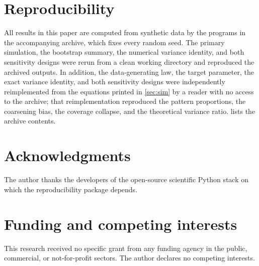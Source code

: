 \documentclass[11pt]{article}
\newif\ifinternal
\theoremstyle{definition}
\newcommand{\1}{\mathbf{1}}
\begin{document}
\section*{Reproducibility}

All results in this paper are computed from synthetic data by the programs in
the accompanying archive, which fixes every random seed. The primary simulation,
the bootstrap summary, the numerical variance identity, and both sensitivity
designs were rerun from a clean working directory and reproduced the archived
outputs. In addition, the data-generating law, the target parameter, the exact
variance identity, and both sensitivity designs were independently
reimplemented from the equations printed in \cref{sec:sim} by a reader with no
access to the archive; that reimplementation reproduced the pattern
proportions, the coarsening bias, the coverage collapse, and the theoretical
variance ratio.  lists the archive contents.
\fi

\section*{Acknowledgments}

\ifinternal
This draft was developed for scientific review. Individuals who contribute
substantially to conception, derivation, software, interpretation, or revision
should be considered for authorship only after explicit discussion and
agreement. No additional author is assigned in this draft.
\else
The author thanks the developers of the open-source scientific Python stack on
which the reproducibility package depends.
\fi

\section*{Funding and competing interests}

\ifinternal
To be completed by the author before submission: confirm whether any portion of
this work was supported by institutional funds or fellowships, and state
affiliations current at submission.
\else
This research received no specific grant from any funding agency in the public,
commercial, or not-for-profit sectors. The author declares no competing
interests.
\fi
\end{document}
